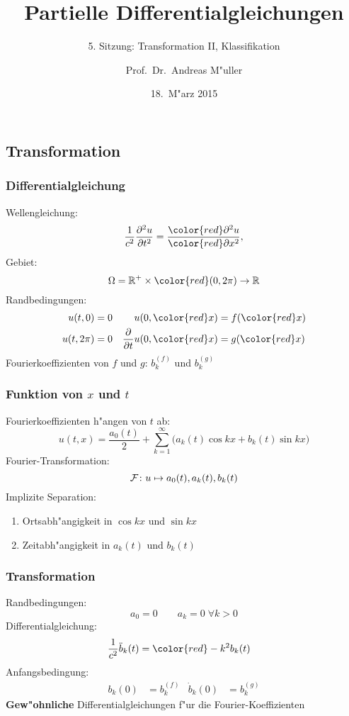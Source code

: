 \documentclass{beamer}
\title[]{Partielle Differentialgleichungen}
\subtitle{5. Sitzung: Transformation II, Klassifikation}
\date[18.~M"arz 2015]{18.~M"arz 2015}
\author{Prof.~Dr.~Andreas M"uller}
\begin{document}
\begin{frame}
\section{Transformation}
\titlepage
\end{frame}

\begin{frame}
\frametitle{Differentialgleichung}

Wellengleichung:
\[
\frac{1}{c^2}
\frac{\partial^2 u}{\partial t^2}
=
\frac{{\color{red}\partial^2} u}{{\color{red}\partial x^2}},
\]
Gebiet:
\[
\Omega = \mathbb R^+ \times {\color{red}(0,2\pi)} \to \mathbb R
\]
Randbedingungen:
\begin{align*}
u(t,    0)&= 0&u(0,{\color{red}x})&=f({\color{red}x})\\
u(t, 2\pi)&= 0&\frac{\partial}{\partial t}u(0,{\color{red}x})&=g({\color{red}x})
\end{align*}
Fourierkoeffizienten von $f$ und $g$: $b_k^{(f)}$ und $b^{(g)}_k$

\end{frame}

\begin{frame}
\frametitle{Funktion von $x$ und $t$}

Fourierkoeffizienten h"angen von $t$ ab:
\[
u(t,x)=\frac{a_0(t)}2+\sum_{k=1}^\infty \bigl(a_k(t)\cos kx+b_k(t)\sin kx\bigr)
\]
Fourier-Transformation:
\[
{\cal F}\colon
u\mapsto
a_0(t), a_k(t), b_k(t)
\]
Implizite Separation:
\begin{enumerate}
\item Ortsabh"angigkeit in $\cos kx$ und $\sin kx$
\item Zeitabh"angigkeit in $a_k(t)$ und $b_k(t)$
\end{enumerate}

\end{frame}

\begin{frame}
\frametitle{Transformation}
Randbedingungen:
\[
a_0=0\qquad
a_k=0\;\forall k > 0
\]
Differentialgleichung:
\begin{align*}
\frac{1}{c^2}\ddot b_k(t)&= {\color{red}-k^2}b_k(t)
\end{align*}
Anfangsbedingung:
\begin{align*}
b_k(0)&= b_k^{(f)}& \dot b_k(0)&=b_k^{(g)}
\end{align*}
{\bf Gew"ohnliche} Differentialgleichungen f"ur die Fourier-Koeffizienten
\end{frame}
\end{document}
